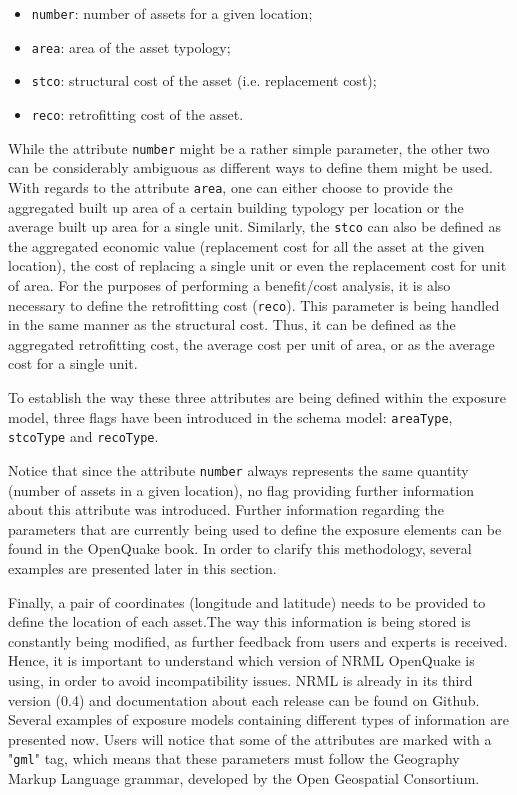 \begin{itemize}
\item  \Verb+number+: number of assets for a given location;
\item  \Verb+area+: area of the asset typology;
\item  \Verb+stco+: structural cost of the asset (i.e. replacement cost); 
\item  \Verb+reco+: retrofitting cost of the asset. 
\end{itemize}

While the attribute \Verb+number+ might be a rather simple parameter, the other two can be considerably ambiguous as different ways to define them might be used. With regards to the attribute \Verb+area+, one can either choose to provide the aggregated built up area of a certain building typology per location or the average built up area for a single unit. Similarly, the \Verb+stco+ can also be defined as the aggregated economic value (replacement cost for all the asset at the given location), the cost of replacing a single unit or even the replacement cost for unit of area. For the purposes of performing a benefit/cost analysis, it is also necessary to define the retrofitting cost (\Verb+reco+). This parameter is being handled in the same manner as the structural cost. Thus, it can be defined as the aggregated retrofitting cost, the average cost per unit of area, or as the average cost for a single unit. 

To establish the way these three attributes are being defined within the exposure model, three flags have been introduced in the schema model:  \Verb+areaType+, \Verb+stcoType+ and \Verb+recoType+.

Notice that since the attribute \Verb+number+ always represents the same quantity (number of assets in a given location), no flag providing further information about this attribute was introduced. Further information regarding the parameters that are currently being used to define the exposure elements can be found in the OpenQuake book. In order to clarify this methodology, several examples are presented later in this section.

Finally, a pair of coordinates (longitude and latitude) needs to be provided to define the location of each asset.The way this information is being stored is constantly being modified, as further feedback from users and experts is received. Hence, it is important to understand which version of NRML OpenQuake is using, in order to avoid incompatibility issues. NRML is already in its third version (0.4) and documentation about each release can be found on Github. Several examples of exposure models containing different types of information are presented now. Users will notice that some of the attributes are marked with a "\Verb+gml+" tag, which means that these parameters must follow the Geography Markup Language grammar, developed by the Open Geospatial Consortium.\

